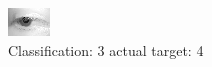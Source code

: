 \begin{figure}[h!]
\begin{center}
\includegraphics[width=0.60\columnwidth]{figures/ID2651_class_3_target_4.png}
\end{center}
\caption{ Classification: 3 actual target: 4}
\label{fig:ID2651_class_3_target_4}
\end{figure}

